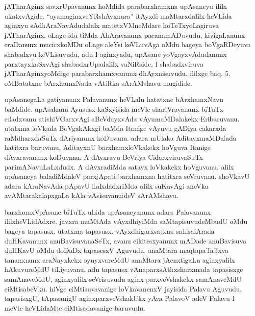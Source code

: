 
\begin{artha}
jATharAginx savxrUpavanunx hoMdida parabarxhamxna upAsaneyu ililx ukatxvAgide. ``ayamaginxveYRshAvxnara'' itAyxdi maMtarxdalilx heVLida aginxyu sAdhAraNavAdudalalx matetxVMneMdare hoTeTxyoLagiruva jATharAginx, oLage idu tiMda AhAravanunx pacanamADuvudu, kivigaLanunx eraDanunx mucicxkoMDu oLage aleYsi keVLuvAga oMdu bageya boVgaRDeyuva shabadxvu keVLisuvudu, adu I aginxyadu, upAsane yoVgayxvAdudanunx parxtayxkaSxvAgi shabadxrUpadalilx vaNiRside, I shabadxviruva jATharAginxyoMdige parabarxhamxvanunx dhAyxnisuvudu. ililxge baq. 5. oMBatatxne bArxhamxNada vAtiRka sArAMshavu mugidide.
\end{artha}


\begin{artha}
upAsanegaLa gatiyanunx Palavanunx heVLalu hatatxne bArxhamxNavu baMdide. upAsakanu Ayususx kaSxyisida meVle shariVravanunx biTuTx edadxvanu atishiVGarxvAgi aBeVdayxvAda vAyumaMDalakekx Eribaruvanu. utatxma loVkada BoVgakAkxgi baMda Itanige vAyuvu gADiya cakarxda raMdharxdaSuTx dAriyanunx koDuvanu. adara mUlaka AditayxmaMDalada hatitxra baruvanu, AditayxnU barxhamxloVkakekx hoVguva Itanige dAvxravanunx koDuvanu. A dAvxravu BeVriya CidarxviruvaSuTx parimANavuLaLxdudx. A dAvxradiMda satayx loVkakekx hoVguvanu. alilx upAsaneya baladiMdaleV parxjApati barxhamxna hatitxra seVruvanu. shoVkavU adara kAraNavAda pApavU ilalxdadxriMda alilx suKavAgi aneVka avAMtarakalapxgaLa kAla vAsisuvanu\ndash  ideV sArAMshavu.
\end{artha}

\eject


\begin{artha}
barxhomxVpAsane biTuTx uLida upAsaneyanunx adara Palavanunx ililx\break heVLidAdxre. javxra muMtAda vAyxdhiyiMda saMtapisuvudeMbudU oMdu bageya tapasusx. utatxma tapasusx. vAyxdhigarxsatxnu sahisalArada duHKavanunx anuBavisuvanaSeTx, avanu cikitesxyanunx mADade anuBavisuva duHKavU oMdu doDaDx tapasesxV Aguvudu. anaMtara maqtapaTaTxva tananxnunx araNayxkekx oyuyxvareMdU anaMtara jAcnxtigaLu aginxyalilx hAkuvureMdU tiLiyuvanu. adu tapasusx vAnaparxsAthxsharxmada tapasisxge samAnaveMdU, aginxyalilx seVrisuvudu aginx parxveVshakekx samAnaveMdU ciMtisabeVku. hiVge ciMtisuvavanige loVkavanenxV jayisida Palavu Aguvudu, tapasisxgU, tApasanigU aginxparxveVshakUkx yAva PalavoV adeV Palavu I meVle heVLidaMte ciMtisadavanige baruvudu.
\end{artha}

